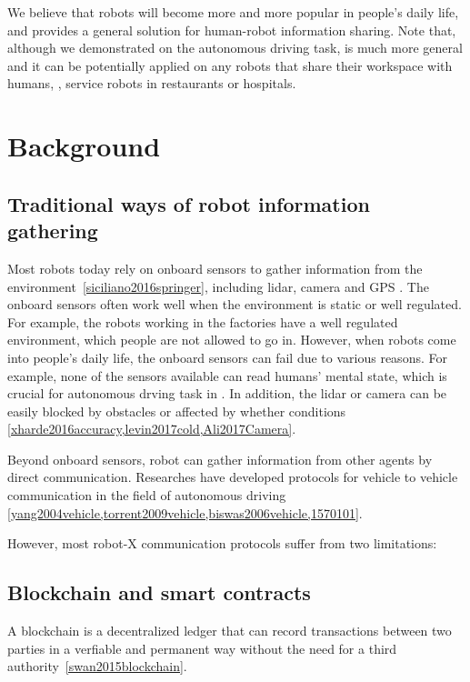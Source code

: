 \documentclass{article}
\begin{document}
We believe that robots will become more and more popular in
people's daily life, and \nrc provides a general solution
for human-robot information sharing.
Note that, although we demonstrated \nrc on the autonomous
driving task, \nrc is much more general and it can
be potentially applied on any robots that share their workspace
with humans, \eg, service robots in restaurants or hospitals.


\section{Background}
\label{sec:background}

\subsection{Traditional ways of robot information gathering}
\label{subsec:tranditional-ways}

Most robots today rely on onboard sensors to gather information
from the environment~\cref{siciliano2016springer},
including lidar, camera and GPS \etc.
The onboard sensors often work well when the environment is
static or well regulated.
For example, the robots working in the factories have a well
regulated environment, which people are not allowed to go in.
However, when robots come into people's daily life, the onboard
sensors can fail due to various reasons.
For example, none of the sensors available can read humans'
mental state, which is crucial for autonomous drving task in 
.
In addition, the lidar or camera can be easily blocked by
obstacles or affected by whether conditions
\cref{xharde2016accuracy,levin2017cold,Ali2017Camera}.


Beyond onboard sensors, 
robot can gather information from other agents by
direct communication.
Researches have developed protocols for vehicle to vehicle
communication in the field of autonomous driving
\cref{yang2004vehicle,torrent2009vehicle,biswas2006vehicle,1570101}.

However, most robot-X communication protocols
suffer from two limitations:


\subsection{Blockchain and smart contracts}
\label{subsec:blockchain}

A blockchain is a decentralized ledger that can record
transactions between two parties in a verfiable and permanent
way without the need for a third authority~\cref{swan2015blockchain}.
\end{document}
